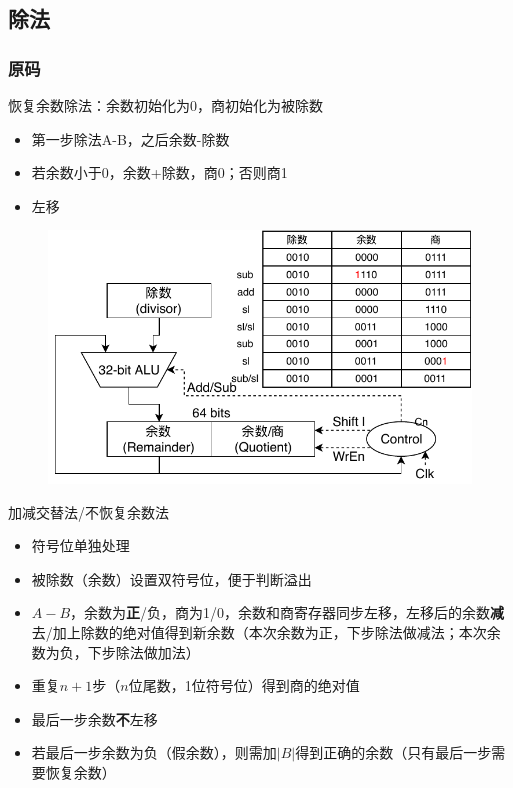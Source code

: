 \subsection{除法}
\subsubsection{原码}
恢复余数除法：余数初始化为0，商初始化为被除数
\begin{itemize}
	\item 第一步除法A-B，之后余数-除数
	\item 若余数小于0，余数+除数，商0；否则商1
	\item 左移
\end{itemize}
\begin{figure}[H]
\centering
\includegraphics[width=0.6\linewidth]{fig/Arithmetic-Division.pdf}
\end{figure}
\par 加减交替法/不恢复余数法
\begin{itemize}
	\item 符号位单独处理
	\item 被除数（余数）设置双符号位，便于判断溢出
	\item $A-B$，余数为\textbf{正}/负，商为1/0，余数和商寄存器同步左移，左移后的余数\textbf{减}去/加上除数的绝对值得到新余数（本次余数为正，下步除法做减法；本次余数为负，下步除法做加法）
	\item 重复$n+1$步（$n$位尾数，1位符号位）得到商的绝对值
	\item 最后一步余数\textbf{不}左移
	\item 若最后一步余数为负（假余数），则需加$|B|$得到正确的余数（只有最后一步需要恢复余数）
\end{itemize}

